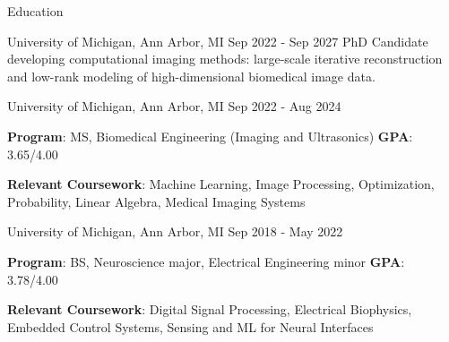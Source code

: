 \documentclass{resume}
\begin{document}
\begin{rSection}{Education}
\begin{rSubsection}{University of Michigan}{, Ann Arbor, MI \hfill {Sep 2022 - Sep 2027}}
	PhD Candidate developing computational imaging methods: large-scale iterative reconstruction and low-rank modeling of high-dimensional biomedical image data.
\end{rSubsection}
\begin{rSubsection}{University of Michigan}{, Ann Arbor, MI \hfill {Sep 2022 - Aug 2024}}
	\item \textbf{Program}: MS, Biomedical Engineering (Imaging and Ultrasonics) \hfill{\textbf{GPA}: 3.65/4.00}
    \item{\textbf{Relevant Coursework}: Machine Learning, Image Processing, Optimization, Probability, Linear Algebra, Medical Imaging Systems}
\end{rSubsection}
\begin{rSubsection}{University of Michigan}{, Ann Arbor, MI \hfill {Sep 2018 - May 2022}}
	\item{\textbf{Program}: BS, Neuroscience major, Electrical Engineering minor} \hfill{\textbf{GPA}: 3.78/4.00}
    \item{\textbf{Relevant Coursework}: Digital Signal Processing, Electrical Biophysics, Embedded Control Systems, Sensing and ML for Neural Interfaces}
\end{rSubsection}
\end{rSection}
\end{document}
